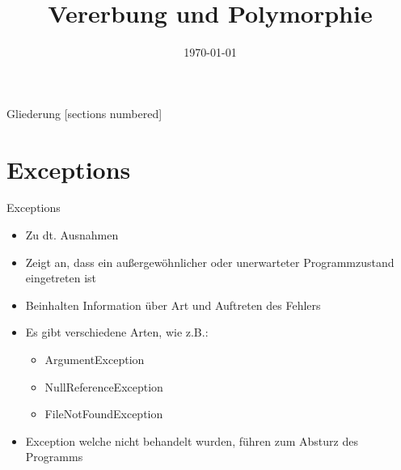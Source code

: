 



\title{Vererbung und Polymorphie}
\date{\today}




\maketitle

\begin{frame}{Gliederung}
	[sections numbered]
	\tableofcontents
\end{frame}

\section{Exceptions}
\begin{frame}{Exceptions}
	\begin{itemize}
		\item Zu dt. Ausnahmen
		\item Zeigt an, dass ein außergewöhnlicher oder unerwarteter Programmzustand eingetreten ist
		\item Beinhalten Information über Art und Auftreten des Fehlers
		\item Es gibt verschiedene Arten, wie z.B.:
		\begin{itemize} 
			\item ArgumentException
			\item NullReferenceException	
			\item FileNotFoundException
		\end{itemize}
		\item Exception welche nicht behandelt wurden, führen zum Absturz des Programms
	\end{itemize}
\end{frame}

